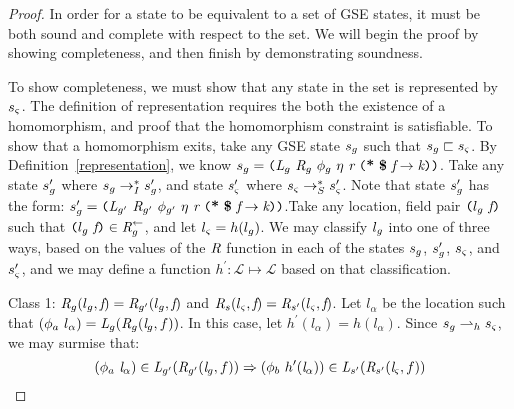 \begin{proof}
In order for a state to be equivalent to a set of GSE states, it must be both sound and complete with respect to the set. We will begin the proof by showing completeness, and then finish by demonstrating soundness.

To show completeness, we must show that any state in the set is represented by $s_{\varsigma}$. The definition of representation requires the both the existence of a homomorphism, and proof that the homomorphism constraint is satisfiable. To show that a homomorphism exits, take any GSE state $s_{g}$ such that $s_{g} \sqsubset s_{\varsigma}$. By Definition~\ref{representation}, we know $s_\gse = \lp \cfgnt{L}_\gse\ \cfgnt{R}_\gse\ \phi_\gse\ \eta\ \cfgnt{r}\ \lp \cfgt{*}\ \cfgt{\$}\ \cfgnt{f} \rightarrow \cfgnt{k}\rp \rp$. Take any state $s_{g}^\prime$ where $s_{g} \rightarrow_I^* s_{g}^\prime$, and state $s_{\varsigma}^\prime$ where $s_{\varsigma} \rightarrow_S^* s_{\varsigma}^\prime$. Note that  state $s_{g}^\prime$ has the form: $s_\gse^\prime = \lp \cfgnt{L}_{\gse^\prime}\ \cfgnt{R}_{\gse^\prime}\ \phi_{\gse^\prime}\ \eta\ \cfgnt{r}\ \lp \cfgt{*}\ \cfgt{\$}\ \cfgnt{f} \rightarrow \cfgnt{k}\rp \rp$.Take any location, field pair $\texttt{(} l_{g}\  \emph{f}\texttt{)}$ such that $\texttt{(} l_{g}\  \emph{f}\texttt{)} \in \emph{R}_{g}^\leftarrow$, and let $l_{\varsigma} = h(l_{g})$. We may classify $l_{g}$ into one of three ways, based on the values of the $\emph{R}$ function in each of the states $s_{g}$, $s_{g}^\prime$, $s_{\varsigma}$, and $s_{\varsigma}^\prime$, and we may define a function $h^\prime: \mathcal{L} \mapsto \mathcal{L}$ based on that classification.

Class 1: $\emph{R}_{g} ( l_{g},  \emph{f} ) = \emph{R}_{g^\prime} ( l_{g},  \emph{f} )$ and $\emph{R}_{s} ( l_{\varsigma},  \emph{f} ) = \emph{R}_{s^\prime} ( l_{\varsigma},  \emph{f})$.  Let $l_\alpha$ be the location such that ${(\phi_a\ l_\alpha)} = \cfgnt{L}_{\gse}(\cfgnt{R}_{\gse} (\cfgnt{l}_\gse,f )) $. In this case, let $h^\prime(l_\alpha) = h(l_\alpha)$. Since $s_{g} \rightharpoonup_h s_{\varsigma}$, we may surmise that: 
$$(\phi_a\ \emph{l}_\alpha) \in \emph{L}_{g^\prime}(\emph{R}_{g^\prime} (\emph{l}_{g},f )) \Rightarrow (\phi_b\ h^\prime (\emph{l}_\alpha))\in \emph{L}_{s^\prime}(\emph{R}_{s^\prime} (\emph{l}_{\varsigma},f ))$$


\end{proof}
